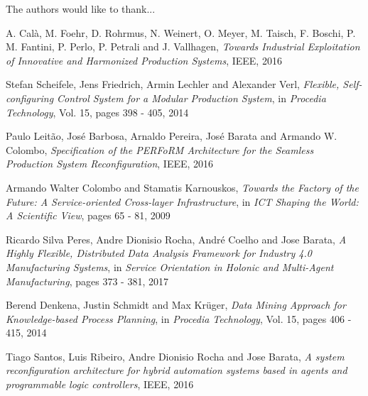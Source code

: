 \documentclass[conference,compsoc,hidelinks]{IEEEtran}
\begin{document}
The authors would like to thank...

\begin{thebibliography}{1}

A. Calà, M. Foehr, D. Rohrmus, N. Weinert, O. Meyer, M. Taisch, F. Boschi, P. M. Fantini, P. Perlo, P. Petrali and J. Vallhagen, \emph{Towards Industrial Exploitation of Innovative and Harmonized Production Systems}, IEEE, 2016

Stefan Scheifele, Jens Friedrich, Armin Lechler and Alexander Verl, \emph{Flexible, Self-configuring Control System for a Modular Production System},
in \emph{Procedia Technology}, Vol. 15, pages 398 - 405, 2014

Paulo Leitão, José Barbosa, Arnaldo Pereira, José Barata  and Armando W. Colombo, \emph{Specification of the PERFoRM Architecture for the Seamless Production System Reconfiguration}, IEEE, 2016

Armando Walter Colombo and Stamatis Karnouskos,
\emph{Towards the Factory of the Future: A Service-oriented Cross-layer Infrastructure}, in \emph{ICT Shaping the World: A Scientific View}, pages 65 - 81, 2009

Ricardo Silva Peres, Andre Dionisio Rocha, André Coelho and Jose Barata, \emph{A Highly Flexible, Distributed Data Analysis Framework for Industry 4.0 Manufacturing Systems}, in \emph{Service Orientation in Holonic and Multi-Agent Manufacturing}, pages 373 - 381, 2017

Berend Denkena, Justin Schmidt and Max Krüger,
\emph{Data Mining Approach for Knowledge-based Process Planning}, in \emph{Procedia Technology}, Vol. 15, pages 406 - 415, 2014

Tiago Santos, Luis Ribeiro, Andre Dionisio Rocha and Jose Barata, \emph{A system reconfiguration architecture for hybrid automation systems based in agents and programmable logic controllers}, IEEE, 2016

\end{thebibliography}

\end{document}
